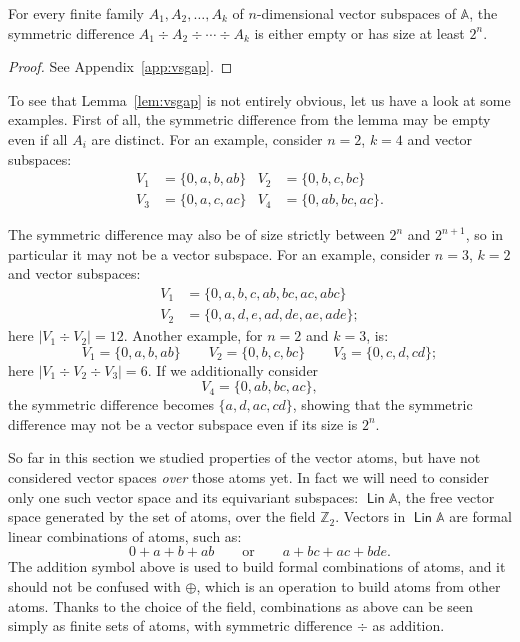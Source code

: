\documentclass{theoretics}
\newcommand{\Z}{{\mathbb Z}}
\newcommand{\xor}{\div}
\newcommand{\atoms}{\mathbb A}
\DeclareMathOperator{\lin}{\mathsf{Lin}}
\begin{document}
\begin{lemma}\label{lem:vsgap}
For every finite family $A_1,A_2,\ldots, A_k$ of $n$-dimensional vector subspaces of $\atoms$, the symmetric difference $A_1\xor A_2\xor\cdots\xor A_k$ is either empty or has size at least $2^n$.
\end{lemma}
\begin{proof}
See Appendix~\ref{app:vsgap}. 
\end{proof}

To see that Lemma~\ref{lem:vsgap} is not entirely obvious, let us have a look at some examples. First of all, the symmetric difference from the lemma may be empty even if all $A_i$ are distinct. For an example, consider $n=2$, $k=4$ and vector subspaces:
\begin{align*}
 V_1 &= \{0,a,b,ab\} & V_2 &= \{0,b,c,bc\} \\
 V_3 &= \{0,a,c,ac\} & V_4 &= \{0,ab,bc,ac\}. 
\end{align*}

The symmetric difference may also be of size strictly between $2^n$ and $2^{n+1}$, so in particular it may not be a vector subspace. For an example, consider $n=3$, $k=2$ and vector subspaces:
\begin{align*}
 V_1 &= \{0,a,b,c,ab,bc,ac,abc\} \\
 V_2 &= \{0,a,d,e,ad,de,ae,ade\};
\end{align*}
here $|V_1\xor V_2|=12$. Another example, for $n=2$ and $k=3$, is:
\[
 V_1 = \{0,a,b,ab\} \qquad V_2 = \{0,b,c,bc\} \qquad V_3 = \{0,c,d,cd\};
\]
here $|V_1\xor V_2\xor V_3|=6$. If we additionally consider
\[
 V_4 = \{0,ab,bc,ac\},
\]
the symmetric difference becomes $\{a,d,ac,cd\}$, showing that the symmetric difference may not be a vector subspace even if its size is $2^n$. 

\medskip

So far in this section we studied properties of the vector atoms, but have not considered vector spaces {\em over} those atoms yet. In fact we will need to consider only one such vector space and its equivariant subspaces: $\lin\atoms$, the free vector space generated by the set of atoms, over the field $\Z_2$. Vectors in $\lin\atoms$ are formal linear combinations of atoms, such as:
\begin{equation}\label{eq:vecvec-ex}
	0 + a + b + ab \qquad \text{or} \qquad a + bc + ac + bde.
\end{equation}
The addition symbol above is used to build formal combinations of atoms, and it should not be confused with $\oplus$, which is an operation to build atoms from other atoms. Thanks to the choice of the field, combinations as above can be seen simply as finite sets of atoms, with symmetric difference $\xor$ as addition.
\end{document}
